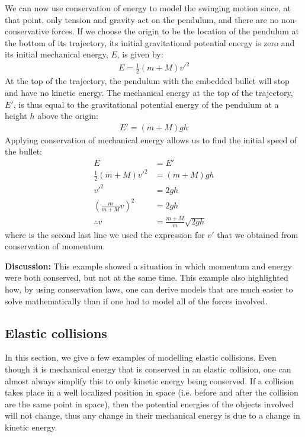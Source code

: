 \begin{example}
We can now use conservation of energy to model the swinging motion since, at that point, only tension and gravity act on the pendulum, and there are no non-conservative forces. If we choose the origin to be the location of the pendulum at the bottom of its trajectory, its initial gravitational potential energy is zero and its initial mechanical energy, $E$, is given by:
\begin{align*}
E = \frac{1}{2}(m+M) v'^2 
\end{align*}
At the top of the trajectory, the pendulum with the embedded bullet will stop and have no kinetic energy. The mechanical energy at the top of the trajectory, $E'$, is thus equal to the gravitational potential energy of the pendulum at a height $h$ above the origin:
\begin{align*}
E' = (m+M)gh
\end{align*}
Applying conservation of mechanical energy allows us to find the initial speed of the bullet:
\begin{align*}
E &= E'\\
\frac{1}{2}(m+M) v'^2 &= (m+M)gh\\
v'^2 &= 2gh\\
\left( \frac{m}{m+M}v\right)^2&= 2gh\\
\therefore v &= \frac{m+M}{m} \sqrt{2gh}
\end{align*}
where is the second last line we used the expression for $v'$ that we obtained from conservation of momentum.

\textbf{Discussion: }This example showed a situation in which momentum and energy were both conserved, but not at the same time. This example also highlighted how, by using conservation laws, one can derive models that are much easier to solve mathematically than if one had to model all of the forces involved.
\end{example}


\subsection{Elastic collisions}
In this section, we give a few examples of modelling elastic collisions. Even though it is mechanical energy that is conserved in an elastic collision, one can almost always simplify this to only kinetic energy being conserved. If a collision takes place in a well localized position in space (i.e. before and after the collision are the same point in space), then the potential energies of the objects involved will not change, thus any change in their mechanical energy is due to a change in kinetic energy.


